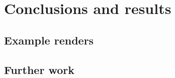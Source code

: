 \chapter{Conclusions and results}
\label{ch:results}

\section{Example renders}

\section{Further work}
